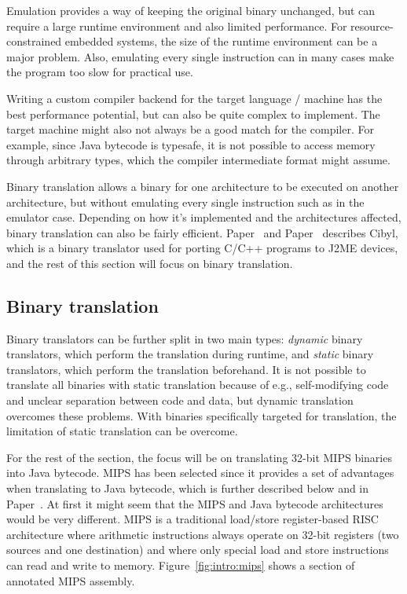 Emulation provides a way of keeping the original binary unchanged, but can
require a large runtime environment and also limited performance. For
resource-constrained embedded systems, the size of the runtime environment can
be a major problem. Also, emulating every single instruction can in many
cases make the program too slow for practical use.

Writing a custom compiler backend for the target language / machine has the
best performance potential, but can also be quite complex to implement. The
target machine might also not always be a good match for the compiler. For
example, since Java bytecode is typesafe, it is not possible to access memory
through arbitrary types, which the compiler intermediate format might assume.

Binary translation allows a binary for one architecture to be executed on
another architecture, but without emulating every single instruction such as
in the emulator case. Depending on how it's implemented and the architectures
affected, binary translation can also be fairly efficient.
Paper~ and Paper~ describes
Cibyl, which is a binary translator used for porting C/C++ programs to J2ME
devices, and the rest of this section will focus on binary translation.

\subsection{Binary translation}
Binary translators can be further split in two main types: \emph{dynamic}
binary translators, which perform the translation during runtime, and
\emph{static} binary translators, which perform the translation beforehand. It
is not possible to translate all binaries with static translation because of
e.g., self-modifying code and unclear separation between code and data, but
dynamic translation overcomes these problems. With binaries specifically
targeted for translation, the limitation of static translation can be
overcome.

For the rest of the section, the focus will be on translating 32-bit MIPS
binaries into Java bytecode. MIPS has been selected since it provides a set of
advantages when translating to Java bytecode, which is further described below
and in Paper~. At first it might seem that the MIPS and Java
bytecode architectures would be very different. MIPS is a traditional
load/store register-based RISC architecture where arithmetic instructions
always operate on 32-bit registers (two sources and one destination) and where
only special load and store instructions can read and write to memory.
Figure~\ref{fig:intro:mips} shows a section of annotated MIPS assembly.


